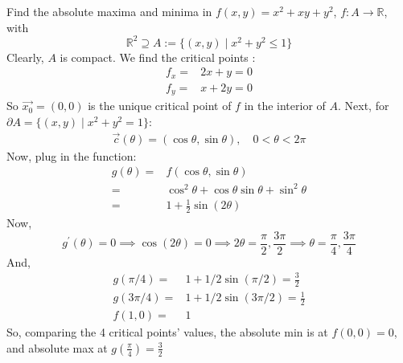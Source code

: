 \documentclass[12pt]{book}
\theoremstyle{definition}
\theoremstyle{remark}
\begin{document}
  \begin{example} Find the absolute maxima and minima in $f(x,y) = x^2 + xy + y^2$, $f: A\to \mathbb{R}$, with $$\mathbb{R}^2 \supseteq A := \{(x,y) \mid x^2 +y^2 \leq 1  \} $$ 
    Clearly, $A$ is compact. We find the critical points : 
    \begin{equation*}
      \begin{split}
        f_x =& 2x+ y = 0 \\ 
        f_y =& x + 2y = 0 
      \end{split}
    \end{equation*}
    So $\vec{{x_0}} =(0,0)$ is the unique critical point of $f$ in the interior of $A$. Next, for $\partial A = \{ (x,y) \mid x^2 + y^2 = 1 \}$: 
    \begin{equation*}
      \begin{split}
        \vec{{c}} (\theta) = (\cos \theta , \sin \theta), \quad 0< \theta < 2 \pi 
      \end{split}
    \end{equation*}
    Now, plug in the function: 
    \begin{equation*}
      \begin{split}
        g(\theta) =&f(\cos \theta , \sin \theta) \\
        =& \cos^2 \theta +  \cos \theta \sin \theta + \sin^2 \theta \\
        =& 1 + \frac{1}{2}  \sin (2 \theta)
      \end{split}
    \end{equation*}
  Now, 
    $$g^\prime (\theta ) = 0 \implies \cos (2 \theta) = 0 \implies 2\theta = \frac{\pi}{2}, \frac{3\pi}{2} \implies  \theta = \frac{\pi}{4} , \frac{3 \pi}{4}  $$
  And, 
    \begin{equation*}
      \begin{split}
        g(  \pi /4  ) =& 1 + 1/2 \sin (\pi /2 ) = \frac{3 }{2} \\
        g(3 \pi / 4) =& 1 + 1/2 \sin (3 \pi / 2) = \frac{1}{2} \\ 
        f(1, 0) =& 1
      \end{split}
    \end{equation*}
    So, comparing the 4 critical points' values, the absolute min is at $f(0,0) = 0$, and absolute max at $g(\frac{\pi}{4}) = \frac{3}{2} $
  \end{example}
\end{document}
